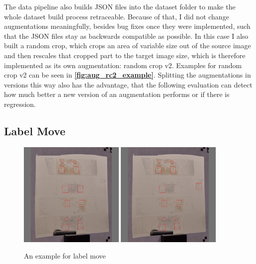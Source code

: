\documentclass[10pt]{book}
\newcommand{\figureref}[1]{\textbf{\autoref{#1}}}
\begin{document}
The data pipeline also builds \ac{JSON} files into the dataset folder to make the whole dataset build process retraceable. Because of that, I did not change augmentations meaningfully, besides bug fixes once they were implemented, such that the \ac{JSON} files stay as backwards compatible as possible. In this case I also built a random crop, which crops an area of variable size out of the source image and then rescales that cropped part to the target image size, which is therefore implemented as its own augmentation: random crop v2. Examples for random crop v2 can be seen in \figureref{fig:aug_rc2_example}. Splitting the augmentations in versions this way also has the advantage, that the following evaluation can detect how much better a new version of an augmentation performs or if there is regression.

\subsection{Label Move}

\begin{figure}
  \centering
     {\includegraphics[width=0.45\textwidth]{image/aug_lm_before}}
     {\includegraphics[width=0.45\textwidth]{image/aug_lm_after}}
  \caption{An example for label move}
  \label{fig:aug_lm_example}
\end{figure}
\end{document}
